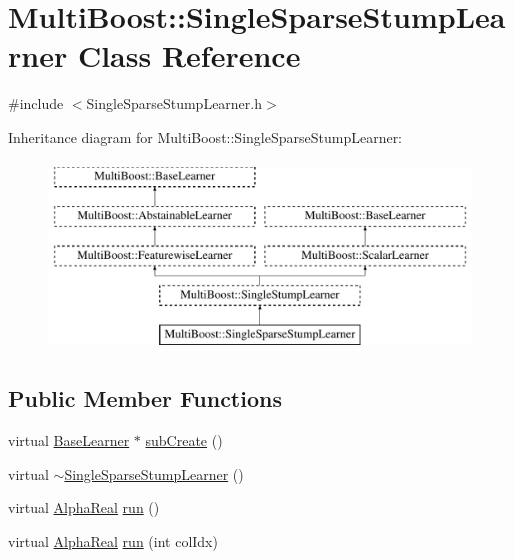 \hypertarget{classMultiBoost_1_1SingleSparseStumpLearner}{
\section{MultiBoost::SingleSparseStumpLearner Class Reference}
\label{classMultiBoost_1_1SingleSparseStumpLearner}
}


{\ttfamily \#include $<$SingleSparseStumpLearner.h$>$}

Inheritance diagram for MultiBoost::SingleSparseStumpLearner:\begin{figure}[H]
\begin{center}
\leavevmode
\includegraphics[height=5.000000cm]{classMultiBoost_1_1SingleSparseStumpLearner}
\end{center}
\end{figure}
\subsection*{Public Member Functions}
\begin{DoxyCompactItemize}
\item 
virtual \hyperlink{classMultiBoost_1_1BaseLearner}{BaseLearner} $\ast$ \hyperlink{classMultiBoost_1_1SingleSparseStumpLearner_adfc0829ce34e21d6bb96081ca1233a3f}{subCreate} ()
\item 
virtual \hyperlink{classMultiBoost_1_1SingleSparseStumpLearner_a5d3c77c6449d6a2a07b09f90c99038b3}{$\sim$SingleSparseStumpLearner} ()
\item 
virtual \hyperlink{Defaults_8h_a80184c4fd10ab70a1a17c5f97dcd1563}{AlphaReal} \hyperlink{classMultiBoost_1_1SingleSparseStumpLearner_ac289b6d69ad526969ebfb4aa4ebf1446}{run} ()
\item 
virtual \hyperlink{Defaults_8h_a80184c4fd10ab70a1a17c5f97dcd1563}{AlphaReal} \hyperlink{classMultiBoost_1_1SingleSparseStumpLearner_af017ed4761b4a5515816fe3aeecf6dc6}{run} (int colIdx)
\end{DoxyCompactItemize}


